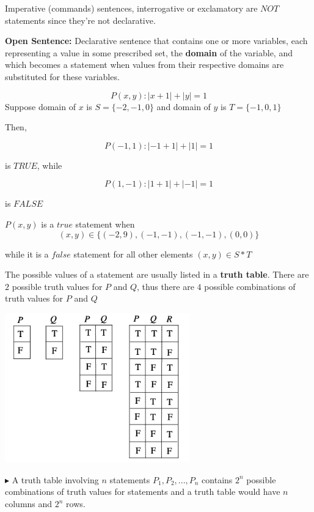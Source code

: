 \documentclass[../Main.tex]{subfiles}
\begin{document}
Imperative (commands) sentences, interrogative or exclamatory are $NOT$ statements since they're not declarative.

\vspace{0.2cm}

\textbf{Open Sentence:} Declarative sentence that contains one or more variables, each representing a value in some prescribed set, the \textbf{domain} of the variable, and which becomes a statement when values from their respective domains are substituted for these variables.

{
\[
P(x,y): |x+1|+|y|=1
\]
Suppose domain of $x$ is $S=\{-2,-1,0\}$ and domain of $y$ is $T=\{-1,0,1\}$

Then, 

\[
P(-1,1): |-1+1|+|1|=1
\]

is $TRUE$, while

\[
P(1,-1): |1+1|+|-1|=1
\]

is $FALSE$

$P(x,y)$ is a $true$ statement when
\[
(x,y)\in \{(-2,9),(-1,-1),(-1,-1),(0,0)\}
\]

while it is a $false$ statement for all other elements $(x,y) \in S *T$
}

The possible values of a statement are usually listed in a \textbf{truth table}. There are $2$ possible truth values for $P$ and $Q$, thus there are $4$ possible combinations of truth values for $P$ and $Q$

\begin{center}
    \includegraphics[width = 8cm]{truth_table.png}    
\end{center}

$\blacktriangleright$ A truth table involving $n$ statements $P_1,P_2,...,P_n$ contains $2^n$ possible combinations of truth values for statements and a truth table would have $n$ columns and $2^n$ rows.
\end{document}

